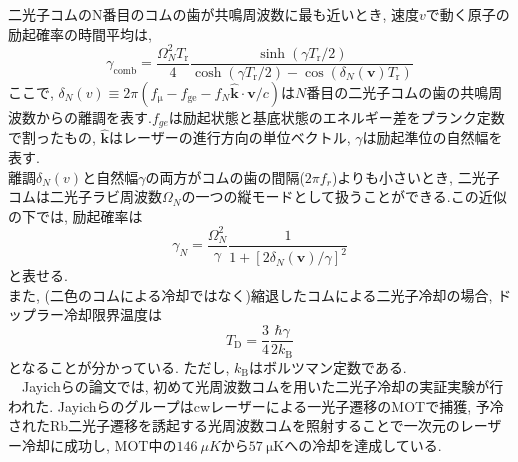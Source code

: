 \documentclass[uplatex, dvipdfmx, a4paper, report, papersize, 11pt]{jsbook}
\begin{document}
二光子コムのN番目のコムの歯が共鳴周波数に最も近いとき, 速度$v$で動く原子の励起確率の時間平均は,
\begin{equation}\label{ExcitationRate}
\gamma_\mathrm{comb} = \frac{\Omega^2_{N}T_\mathrm{r}} {4} \frac{\sinh(\gamma T_\mathrm{r}/2)}{\cosh(\gamma T_\mathrm{r}/2) - \cos(\delta_N(\bm{v})T_\mathrm{r})}
\end{equation}
ここで, $\delta _{N}\left( v\right) \equiv 2\pi ( f_\mathrm{\mu }-f_\mathrm{ge}-f_{N}\widehat {\bm{k}}\cdot {\bm{v}}/c )$は$N$番目の二光子コムの歯の共鳴周波数からの離調を表す.$f_{ge}$は励起状態と基底状態のエネルギー差をプランク定数で割ったもの, $\widehat {\bm{k}}$はレーザーの進行方向の単位ベクトル, $\gamma$は励起準位の自然幅を表す.\\
離調$\delta _{N}\left( v\right)$と自然幅$\gamma$の両方がコムの歯の間隔($2\pi f_r$)よりも小さいとき, 二光子コムは二光子ラビ周波数$\Omega_N$の一つの縦モードとして扱うことができる.この近似の下では, 励起確率は
\begin{equation}\label{EffectiveExcitationRate}
\gamma_N = \frac{\Omega^2_N}{\gamma}\frac{1}{1 + [2\delta_N(\bm{v})/\gamma]^2}
\end{equation}
と表せる.\\
 また, (二色のコムによる冷却ではなく)縮退したコムによる二光子冷却の場合, ドップラー冷却限界温度は
\begin{equation}
  T_\mathrm{D} = \frac{3}{4}\frac{\hbar\gamma}{2k_\mathrm{B}}
\end{equation}
となることが分かっている. ただし, $k_\mathrm{B}$はボルツマン定数である. \\
　Jayichらの論文\cite{PhysRevX.6.041004}では, 初めて光周波数コムを用いた二光子冷却の実証実験が行われた. Jayichらのグループはcwレーザーによる一光子遷移のMOTで捕獲, 予冷されたRb二光子遷移を誘起する光周波数コムを照射することで一次元のレーザー冷却に成功し, MOT中の$146\ {\mu K}$から$57\ \mathrm{\mu K}$への冷却を達成している.
\end{document}
